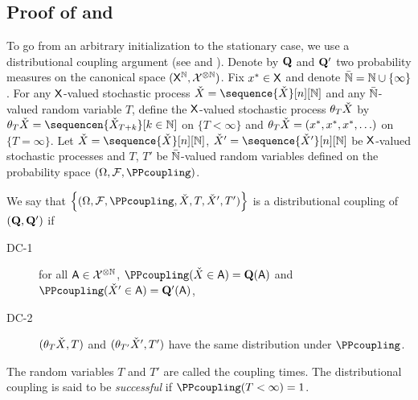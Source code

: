 \subsection{Proof of  and }
\label{sec:non-stationary-extension}
To go from an arbitrary initialization to the stationary case, we  use a distributional coupling argument (see \cite{thorisson1986maximal} and \cite[Chapter~19]{douc:moulines:priouret:soulier:2018}).
Denote by $\QQ$ and $\QQ'$ two
probability measures on the canonical space  $(\mathsf{X}^{\mathbb{N}},\mathcal{X}^{\otimes \mathbb{N}})$.
Fix $x^*\in \mathsf{X}$ and denote $\bar{\mathbb{N}} = \mathbb{N} \cup \{\infty\}$. For any $\mathsf{X}$-valued stochastic process $\Xcoupling=\sequence{\Xcoupling}[n][\nset]$ and any
$\bar {\mathbb{N}}$-valued random variable $T$, define the $\mathsf{X}$-valued stochastic process $\theta_T \check{X}$
by $\shift_T \Xcoupling=\sequencen{\Xcoupling_{T+k}}[k \in \nset]$ on $\{T<\infty\}$ and $\theta_T \check{X}=(x^*,x^*,
x^*,\ldots)$ on $\{T=\infty\}$.
Let $\Xcoupling=\sequence{\Xcoupling}[n][\nset]$, $\Xcoupling'=\sequence{\Xcoupling'}[n][\nset]$ be  $\mathsf{X}$-valued stochastic
processes and $T$, $T'$ be $\bar {\mathbb{N}}$-valued random variables defined on the
probability space $(\Omega,\mcf,\PPcoupling)$.

We say that $\left\{(\Omega,\mcf,\PPcoupling,\Xcoupling,T,\Xcoupling',T') \right\}$ is a distributional coupling of $(\QQ,\QQ')$ if
\begin{description}
  \item[DC-1] for all $\mathsf{A} \in \mathcal{X}^{\otimes \mathbb{N}}$, $\PPcoupling(\Xcoupling \in \msa)=\QQ(\msa)$ and $\PPcoupling(\Xcoupling' \in \msa)=\QQ'(\msa)$,
  \item[DC-2] $(\theta_T \check{X}, T)$ and $(\theta_{T'} \check{X}', T')$ have the same distribution  under $\PPcoupling$.
\end{description}
The random variables $T$ and $T'$ are called the coupling times.  The distributional coupling is said to be \emph{successful} if $\PPcoupling(T<\infty)=1$.

